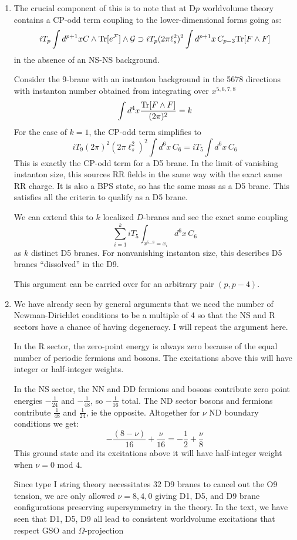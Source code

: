 \documentclass[11pt, class=article, crop=false]{standalone}
\begin{document}
\begin{enumerate}
	
	\item The crucial component of this is to note that at D$p$ worldvolume theory contains a CP-odd term coupling to the lower-dimensional forms going as:
	\[
		i T_p \int d^{p+1} x C \wedge \mathrm{Tr} [e^{\mathcal F}] \wedge \mathcal G \supset i T_p (2\pi \ell_s^2)^2 \int d^{p+1} x\,  C_{p-3}  \mathrm{Tr}[F \wedge F]
	\]
	in the absence of an NS-NS background. 
	
	Consider the $9$-brane with an instanton background in the 5678 directions with instanton number obtained from integrating over $x^{5,6,7,8}$
	\[
		 \int d^4 x \frac{\mathrm{Tr}[F \wedge F]}{(2\pi)^2} = k
	\]
	For the case of $k=1$, the CP-odd term simplifies to
	\[
		i T_9 (2 \pi)^2 (2 \pi \ell_s^2)^2  \int d^{6} x\, C_{6} = i T_{5} \int d^{6} x \,  C_{6} 
	\] 
	This is exactly the CP-odd term for a D5 brane. In the limit of vanishing instanton size, this sources RR fields in the same way with the exact same RR charge. It is also a BPS state, so has the same mass as a D5 brane. This satisfies all the criteria to qualify as a D5 brane. 
	
	We can extend this to $k$ localized $D$-branes and see the exact same coupling
	\[
		\sum_{i=1}^k i T_5 \int_{x^{5 \dots 8} = x_i} d^6 x\, C_6
	\]
	as $k$ distinct D5 branes. For nonvanishing instanton size, this describes D5 branes ``dissolved'' in the D9.
	
	This argument can be carried over for an arbitrary pair $(p, p-4)$. 
	
	\item We have already seen by general arguments that we need the number of Newman-Dirichlet conditions to be a multiple of 4 so that the NS and R sectors have a chance of having degeneracy. I will repeat the argument here. 
	
	In the R sector, the zero-point energy is always zero because of the equal number of periodic fermions and bosons. The excitations above this will have integer or half-integer weights. 
	
	In the NS sector, the NN and DD fermions and bosons contribute zero point energies $-\frac{1}{24}$ and $-\frac{1}{48}$, so $-\frac{1}{16}$ total. The ND sector bosons and fermions contribute $\frac{1}{48}$ and $\frac{1}{24}$, ie the opposite. Altogether for $\nu$ ND boundary conditions we get:
	\[
		- \frac{(8 - \nu)}{16} + \frac{\nu}{16} = - \frac12 + \frac{\nu}{8}
	\]
	This ground state and its excitations above it will have half-integer weight when $\nu = 0$ mod $4$.
	
	 Since type I string theory necessitates 32 D9 branes to cancel out the O9 tension, we are only allowed $\nu=8,4,0$ giving D1, D5, and D9 brane configurations preserving supersymmetry in the theory.
	In the text, we have seen that D1, D5, D9 all lead to consistent worldvolume excitations that respect GSO and $\Omega$-projection 
	

\end{enumerate}
\end{document}
